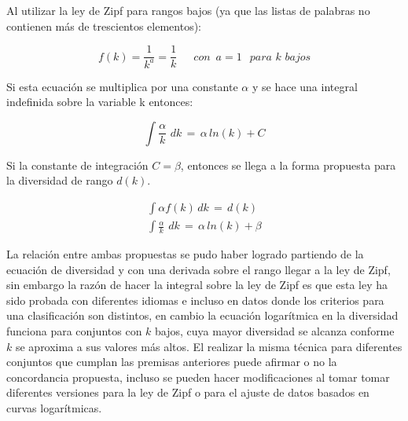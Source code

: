 Al utilizar la ley de Zipf para rangos bajos (ya que las listas de palabras no contienen más de trescientos elementos):

\begin{equation}
	\label{ec.Zipf_kbajos}
	f(k) = \frac{1}{k^{a}} =  \frac{1}{k}  \,\,\,  \,\,\, \,\,\, con   \,\,\,a=1\ \,\,\,para\,\, k\,\, bajos
\end{equation} 

Si esta ecuación se multiplica por una constante $\alpha$ y se hace una integral indefinida sobre la variable k  entonces:

\begin{equation}
	\label{ec.Zipf_int}
	\int \frac{\alpha}{k}\,\,dk \, = \, \alpha \, ln \left(k\right) + C
\end{equation} 

Si la constante de integración $C = \beta$, entonces se llega a la forma propuesta para la diversidad de rango $d(k)$.  

\begin{subequations}
	\begin{align}
		\label{ec.Zipf_dk}
		\int \alpha f\left(k\right) \,dk \,=\, d(k) \\
		\int \frac{\alpha}{k}\,\,dk \, = \, \alpha \, ln \left(k\right) + \beta	
	\end{align}
\end{subequations}


La relación entre ambas propuestas se pudo haber logrado partiendo de la ecuación de diversidad y con una derivada sobre el rango llegar a la ley de Zipf, sin embargo la razón de hacer la integral sobre la ley de Zipf es que esta ley  ha sido probada con diferentes idiomas e incluso en datos donde los criterios para una clasificación son distintos, en cambio la ecuación logarítmica en la diversidad funciona para conjuntos con $k$ bajos, cuya mayor diversidad se alcanza conforme $k$ se aproxima a sus valores más altos.   El realizar la misma técnica para diferentes conjuntos que cumplan  las premisas anteriores puede afirmar o no la concordancia propuesta, incluso se pueden hacer modificaciones al tomar tomar diferentes versiones para la ley de Zipf o para el ajuste de datos basados en curvas logarítmicas.





